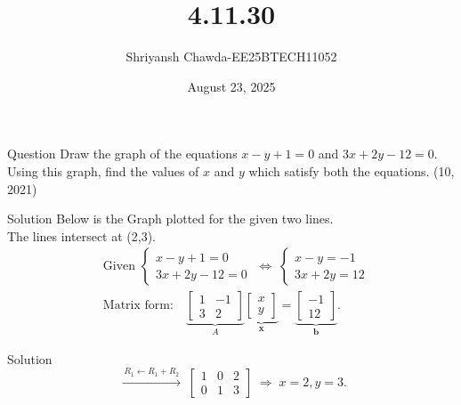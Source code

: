 \documentclass{beamer}
\title{4.11.30}
\author{Shriyansh Chawda-EE25BTECH11052}
\date{August 23, 2025}
\begin{document}
	

		\frame{\titlepage}
	
	
	\begin{frame}{Question} 
Draw the graph of the equations $x - y + 1 = 0$ and $3x + 2y - 12 = 0$. Using this graph, find the values of $x$ and $y$ which satisfy both the equations. 
		\hfill (10, 2021)
	\end{frame}
	

\begin{frame}{Solution}
	Below is the Graph plotted for the given two lines.\\
	The lines intersect at (2,3).\\
\[
\begin{aligned}
	&\text{Given } 
	\begin{cases}
		x - y + 1 = 0\\
		3x + 2y - 12 = 0
	\end{cases}
	\;\Longleftrightarrow\;
	\begin{cases}
		x - y = -1\\
		3x + 2y = 12
	\end{cases} \\[4pt]
	&\text{Matrix form:}\quad
	\underbrace{\begin{bmatrix}1 & -1\\ 3 & 2\end{bmatrix}}_{A}
	\underbrace{\begin{bmatrix}x\\y\end{bmatrix}}_{\mathbf{x}}
	=
	\underbrace{\begin{bmatrix}-1\\12\end{bmatrix}}_{\mathbf{b}}.
\end{aligned}
\]
\end{frame}
\begin{frame}{Solution}
		\[
		\;\xrightarrow{\,R_1 \leftarrow R_1 + R_2\,}\;
		\left[
		\begin{array}{cc|c}
			1 & 0 & 2\\
			0 & 1 & 3
		\end{array}
		\right]
		\;\Longrightarrow\;
		x = 2, y = 3.
		\]
\end{frame}
\end{document}
